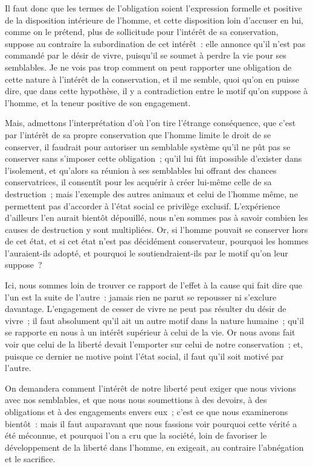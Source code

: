 \documentclass[french,twoside]{book} %
\newcommand\chapterclose{} %
\begin{document}
Il faut donc que les termes de l’obligation soient l’expression formelle et positive de la disposition intérieure de l’homme, et cette disposition loin d’accuser en lui, comme on le prétend, plus de sollicitude pour l’intérêt de sa conservation, suppose au contraire la subordination de cet intérêt : elle annonce qu’il n’est pas commandé par le désir de vivre, puisqu’il se soumet à perdre la vie pour ses semblables. Je ne vois pas trop comment on peut rapporter une obligation de cette nature à l’intérêt de la conservation, et il me semble, quoi qu’on en puisse dire, que dans cette hypothèse, il y a contradiction entre le motif qu’on suppose à l’homme, et la teneur positive de son engagement.\par
Mais, admettons l’interprétation d’où l’on tire l’étrange conséquence, que c’est par l’intérêt de sa propre conservation que l’homme limite le droit de se conserver, il faudrait pour autoriser un semblable système qu’il ne pût pas se conserver sans s’imposer cette obligation ; qu’il lui fût impossible d’exister dans l’isolement, et qu’alors sa réunion à ses semblables lui offrant des chances conservatrices, il consentît pour les acquérir à créer lui-même celle de sa destruction ; mais l’exemple des autres animaux et celui de l’homme même, ne permettent pas d’accorder à l’état social ce privilège exclusif. L’expérience d’ailleurs l’en aurait bientôt dépouillé, nous n’en sommes pas à savoir combien les causes de destruction y sont multipliées. Or, si l’homme pouvait se conserver hors de cet état, et si cet état n’est pas décidément conservateur, pourquoi les hommes l’auraient-ils adopté, et pourquoi le soutiendraient-ils par le motif qu’on leur suppose ?\par
Ici, nous sommes loin de trouver ce rapport de l’effet à la cause qui fait dire que l’un est la suite de l’autre : jamais rien ne parut se repousser ni s’exclure davantage. L’engagement de cesser de vivre ne peut pas résulter du désir de vivre ; il faut absolument qu’il ait un autre motif dans la nature humaine ; qu’il se rapporte en nous à un intérêt supérieur à celui de la vie. Or nous avons fait voir que celui de la liberté devait l’emporter sur celui de notre conservation ; et, puisque ce dernier ne motive point l’état social, il faut qu’il soit motivé par l’autre.\par
On demandera comment l’intérêt de notre liberté peut exiger que nous vivions avec nos semblables, et que nous nous soumettions à des devoirs, à des obligations et à des engagements envers eux ; c’est ce que nous examinerons bientôt : mais il faut auparavant que nous fassions voir pourquoi cette vérité a été méconnue, et pourquoi l’on a cru que la société, loin de favoriser le développement de la liberté dans l’homme, en exigeait, au contraire l’abnégation et le sacrifice.
\chapterclose
\end{document}
